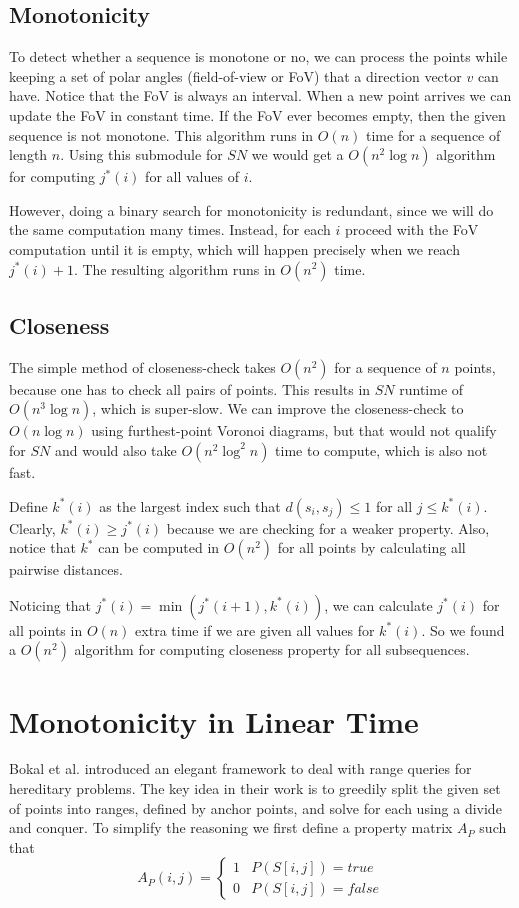 \documentclass{article}
\newcommand{\twopartdef}[4]
{
    \left\{
    \begin{array}{ll}
        #1 & #2 \\
        #3 & #4
    \end{array}
    \right.
}
\begin{document}
\subsection{Monotonicity}
\label{sec:naive:monotonicity}
To detect whether a sequence is monotone or no, we can process the points while keeping a set of polar angles (field-of-view or FoV) that a direction vector $v$ can have. Notice that the FoV is always an interval. When a new point arrives we can update the FoV in constant time. If the FoV ever becomes empty, then the given sequence is not monotone. This algorithm runs in $O(n)$ time for a sequence of length $n$. Using this submodule for $SN$ we would get a $O(n^2\log n)$ algorithm for computing $j^*(i)$ for all values of $i$.

However, doing a binary search for monotonicity is redundant, since we will do the same computation many times. Instead, for each $i$ proceed with the FoV computation until it is empty, which will happen precisely when we reach $j^*(i) + 1$. The resulting algorithm runs in $O(n^2)$ time.

\subsection{Closeness}
\label{sec:naive:closeness}
The simple method of closeness-check takes $O(n^2)$ for a sequence of $n$ points, because one has to check all pairs of points. This results in $SN$ runtime of $O(n^3\log n)$, which is super-slow. We can improve the closeness-check to $O(n\log n)$ using furthest-point Voronoi diagrams, but that would not qualify for $SN$ and would also take $O(n^2 \log^2 n)$ time to compute, which is also not fast.

Define $k^*(i)$ as the largest index such that $d(s_i, s_j) \leq
1$ for all $j \leq k^*(i)$. Clearly, $k^*(i) \geq j^*(i)$ because we are checking for a weaker property. Also,
notice that $k^*$ can be computed in $O(n^2)$ for all points by calculating all pairwise distances.

Noticing that $j^*(i) = \min( j^*(i + 1), k^*(i) )$, we can calculate
$j^*(i)$ for all points in $O(n)$ extra time if we are given all
values for $k^*(i)$. So we found a $O(n^2)$ algorithm for computing
closeness property for all subsequences.

\section{Monotonicity in Linear Time}
\label{sec:monotonicity}
Bokal et al. introduced an elegant framework to deal with range queries for hereditary problems. The key idea in their work is to greedily split the given set of points into ranges, defined by anchor points, and solve for each using a divide and conquer. To simplify the reasoning we first define a property matrix $A_P$ such that
\[ A_P(i, j) = \twopartdef{1}{P(S[i, j]) = true}{0}{P(S[i, j]) = false} \]
\end{document}
